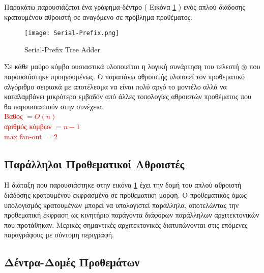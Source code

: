Παρακάτω παρουσιάζεται ένα γράφημα-δέντρο ( Εικόνα \ref{Serial-PrefixTree} ) 
ενός απλού διάδοσης κρατουμένου αθροιστή σε αναγόμενο σε πρόβλημα προθέματος.\\ 
\begin{figure}[H]
\centering
\texttt{[image: Serial-Prefix.png]}
\caption{Serial-Prefix Tree Adder}
\label{Serial-PrefixTree}
\end{figure}
Σε κάθε μαύρο κόμβο ουσιαστικά υλοποιείται η λογική συνάρτηση του τελεστή $\circledast$
που παρουσιάστηκε προηγουμένως. Ο παραπάνω αθροιστής υλοποιεί τον προθεματικό αλγόριθμο
σειριακά με αποτέλεσμα να είναι πολύ αργό το μοντέλο αλλά να καταλαμβάνει μικρότερο εμβαδόν
από άλλες τοπολογίες αθροιστών προθέματος που θα παρουσιαστούν στην συνέχεια.\\
\textcolor{red}{
Βαθος $= O(n)$\\
αριθμός κόμβων $ = n-1$\\
max fan-out $ = 2$
}













\subsection{Παράλληλοι Προθεματικοί Αθροιστές}
Η διάταξη που παρουσιάστηκε στην εικόνα \ref{Serial-PrefixTree} έχει την δομή 
του απλού αθροιστή διάδοσης κρατουμένου εκφρασμένο σε προθεματική μορφή. Ο προθεματικός
όμως υπολογισμός κρατουμένων μπορεί να υπολογιστεί παράλληλα, αποτελώντας την προθεματική 
έκφραση ως κινητήριο παράγοντα διάφορων παράλληλων αρχιτεκτονικών που προτάθηκαν.
Μερικές σημαντικές αρχιτεκτονικές διατυπώνονται στις επόμενες παραγράφους με σύντομη
περιγραφή.




\subsection{Δέντρα-Δομές Προθεμάτων}


